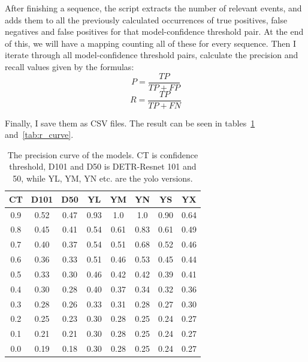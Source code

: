 After finishing a sequence, the script extracts the number of relevant events, and adds them to all the previously calculated occurrences of true positives, false negatives and false positives for that model-confidence threshold pair. At the end of this, we will have a mapping counting all of these for every sequence. Then I iterate through all model-confidence threshold pairs, calculate the precision and recall values given by the formulas:
\[P = \frac{TP}{TP + FP}\]
\[R = \frac{TP}{TP + FN}\]

Finally, I save them as CSV files. The result can be seen in tables~\ref{tab:p_curve} and~\ref{tab:r_curve}.

\begin{table}
    \begin{centering}
    \begin{tabular}{|c||c|c|c|c|c|c|c|}
        \hline
        CT & D101 & D50 & YL & YM & YN & YS & YX \\
        \hline
        \hline
        0.9 & 0.52 & 0.47 & 0.93 & 1.0 & 1.0 & 0.90 & 0.64 \\
        \hline
        0.8 & 0.45 & 0.41 & 0.54 & 0.61 & 0.83 & 0.61 & 0.49 \\
        \hline
        0.7 & 0.40 & 0.37 & 0.54 & 0.51 & 0.68 & 0.52 & 0.46 \\
        \hline
        0.6 & 0.36 & 0.33 & 0.51 & 0.46 & 0.53 & 0.45 & 0.44 \\
        \hline
        0.5 & 0.33 & 0.30 & 0.46 & 0.42 & 0.42 & 0.39 & 0.41 \\
        \hline
        0.4 & 0.30 & 0.28 & 0.40 & 0.37 & 0.34 & 0.32 & 0.36 \\
        \hline
        0.3 & 0.28 & 0.26 & 0.33 & 0.31 & 0.28 & 0.27 & 0.30 \\
        \hline
        0.2 & 0.25 & 0.23 & 0.30 & 0.28 & 0.25 & 0.24 & 0.27 \\
        \hline
        0.1 & 0.21 & 0.21 & 0.30 & 0.28 & 0.25 & 0.24 & 0.27 \\
        \hline
        0.0 & 0.19 & 0.18 & 0.30 & 0.28 & 0.25 & 0.24 & 0.27 \\
        \hline
    \end{tabular}
    \caption{The precision curve of the models. CT is confidence threshold, D101 and D50 is DETR-Resnet 101 and 50, while YL, YM, YN etc. are the yolo versions.}
    \label{tab:p_curve}
    \end{centering}
\end{table}

